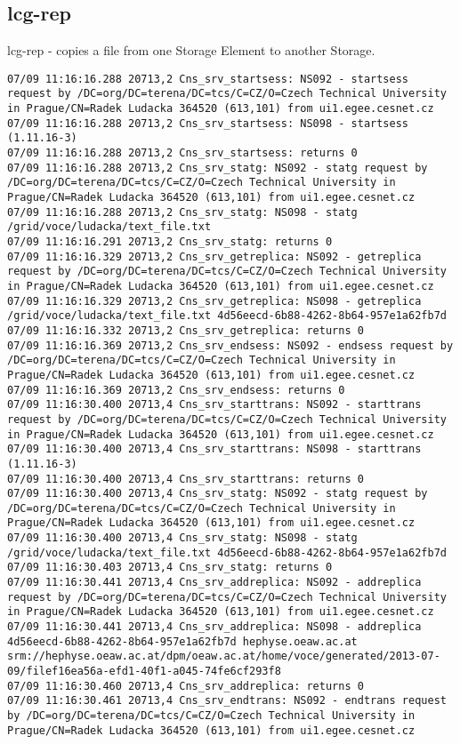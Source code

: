 \documentclass[a4paper, 11pt]{article} %
\begin{document}
\subsection{lcg-rep}

lcg-rep - copies a file from one Storage Element to another Storage.

\begin{lstlisting}[label={log:rep1},caption={lcg-rep --vo voce -d hephyse.oeaw.ac.at lfn:/grid/voce/ludacka/text\_file.txt}]
07/09 11:16:16.288 20713,2 Cns_srv_startsess: NS092 - startsess request by /DC=org/DC=terena/DC=tcs/C=CZ/O=Czech Technical University in Prague/CN=Radek Ludacka 364520 (613,101) from ui1.egee.cesnet.cz
07/09 11:16:16.288 20713,2 Cns_srv_startsess: NS098 - startsess (1.11.16-3)
07/09 11:16:16.288 20713,2 Cns_srv_startsess: returns 0
07/09 11:16:16.288 20713,2 Cns_srv_statg: NS092 - statg request by /DC=org/DC=terena/DC=tcs/C=CZ/O=Czech Technical University in Prague/CN=Radek Ludacka 364520 (613,101) from ui1.egee.cesnet.cz
07/09 11:16:16.288 20713,2 Cns_srv_statg: NS098 - statg /grid/voce/ludacka/text_file.txt 
07/09 11:16:16.291 20713,2 Cns_srv_statg: returns 0
07/09 11:16:16.329 20713,2 Cns_srv_getreplica: NS092 - getreplica request by /DC=org/DC=terena/DC=tcs/C=CZ/O=Czech Technical University in Prague/CN=Radek Ludacka 364520 (613,101) from ui1.egee.cesnet.cz
07/09 11:16:16.329 20713,2 Cns_srv_getreplica: NS098 - getreplica /grid/voce/ludacka/text_file.txt 4d56eecd-6b88-4262-8b64-957e1a62fb7d
07/09 11:16:16.332 20713,2 Cns_srv_getreplica: returns 0
07/09 11:16:16.369 20713,2 Cns_srv_endsess: NS092 - endsess request by /DC=org/DC=terena/DC=tcs/C=CZ/O=Czech Technical University in Prague/CN=Radek Ludacka 364520 (613,101) from ui1.egee.cesnet.cz
07/09 11:16:16.369 20713,2 Cns_srv_endsess: returns 0
07/09 11:16:30.400 20713,4 Cns_srv_starttrans: NS092 - starttrans request by /DC=org/DC=terena/DC=tcs/C=CZ/O=Czech Technical University in Prague/CN=Radek Ludacka 364520 (613,101) from ui1.egee.cesnet.cz
07/09 11:16:30.400 20713,4 Cns_srv_starttrans: NS098 - starttrans (1.11.16-3)
07/09 11:16:30.400 20713,4 Cns_srv_starttrans: returns 0
07/09 11:16:30.400 20713,4 Cns_srv_statg: NS092 - statg request by /DC=org/DC=terena/DC=tcs/C=CZ/O=Czech Technical University in Prague/CN=Radek Ludacka 364520 (613,101) from ui1.egee.cesnet.cz
07/09 11:16:30.400 20713,4 Cns_srv_statg: NS098 - statg /grid/voce/ludacka/text_file.txt 4d56eecd-6b88-4262-8b64-957e1a62fb7d
07/09 11:16:30.403 20713,4 Cns_srv_statg: returns 0
07/09 11:16:30.441 20713,4 Cns_srv_addreplica: NS092 - addreplica request by /DC=org/DC=terena/DC=tcs/C=CZ/O=Czech Technical University in Prague/CN=Radek Ludacka 364520 (613,101) from ui1.egee.cesnet.cz
07/09 11:16:30.441 20713,4 Cns_srv_addreplica: NS098 - addreplica 4d56eecd-6b88-4262-8b64-957e1a62fb7d hephyse.oeaw.ac.at srm://hephyse.oeaw.ac.at/dpm/oeaw.ac.at/home/voce/generated/2013-07-09/filef16ea56a-efd1-40f1-a045-74fe6cf293f8
07/09 11:16:30.460 20713,4 Cns_srv_addreplica: returns 0
07/09 11:16:30.461 20713,4 Cns_srv_endtrans: NS092 - endtrans request by /DC=org/DC=terena/DC=tcs/C=CZ/O=Czech Technical University in Prague/CN=Radek Ludacka 364520 (613,101) from ui1.egee.cesnet.cz
\end{lstlisting}
\end{document}
